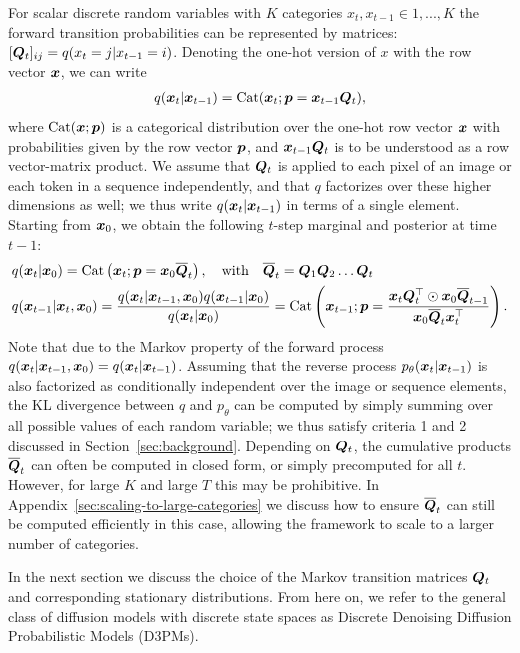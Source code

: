 For scalar discrete random variables with $K$ categories $x_t, x_{t-1} \in {1, ..., K}$
the forward transition probabilities can be represented by matrices: $[\boldsymbol{Q}_t]_{ij} = q(x_t=j|x_{t-1}=i)$.
Denoting the one-hot version of $x$ with the row vector $\boldsymbol{x}$, we can write
\begin{align}
    q(\boldsymbol{x}_t|\boldsymbol{x}_{t-1}) = \mathrm{Cat}(\boldsymbol{x}_t;\boldsymbol{p} = \boldsymbol{x}_{t-1}\boldsymbol{Q}_t),
    \label{eq:forward_Q_t}
\end{align}
where $\mathrm{Cat}(\boldsymbol{x};\boldsymbol{p})$ is a categorical distribution over the one-hot row vector $\boldsymbol{x}$ with probabilities given by the row vector $\boldsymbol{p}$, and $\boldsymbol{x}_{t-1}\boldsymbol{Q}_t$ is to be understood as a row vector-matrix product. 
We assume that $\boldsymbol{Q}_t$ is applied to each pixel of an image or each token in a sequence independently, and that $q$ factorizes over these higher dimensions as well; we thus write $q(\boldsymbol{x}_t|\boldsymbol{x}_{t-1})$ in terms of a single element.
Starting from $\boldsymbol{x}_0$, we obtain the following $t$-step marginal and posterior at time $t-1$:
\begin{align}
    &q(\boldsymbol{x}_t | \boldsymbol{x}_0) = \mathrm{Cat}\left(\boldsymbol{x}_{t}; \boldsymbol{p} = \boldsymbol{x}_{0}\overline{\boldsymbol{Q}}_{t}  \right), 
    \quad \text{with}\quad 
  \overline{\boldsymbol{Q}}_{t} = \boldsymbol{Q}_1  \boldsymbol{Q}_2 \hdots \boldsymbol{Q}_t \nonumber \\
    & q(\boldsymbol{x}_{t-1}|\boldsymbol{x}_{t}, \boldsymbol{x}_0) = \frac{q(\boldsymbol{x}_{t}|\boldsymbol{x}_{t-1}, \boldsymbol{x}_0)q(\boldsymbol{x}_{t-1}|\boldsymbol{x}_0)}{q(\boldsymbol{x}_{t}| \boldsymbol{x}_0)}
    =\mathrm{Cat}\left(\boldsymbol{x}_{t-1};\boldsymbol{p}= \frac{\boldsymbol{x}_t\boldsymbol{Q}_t^{\top} \odot  \boldsymbol{x}_0 \overline{\boldsymbol{Q}}_{t-1}  }{\boldsymbol{x}_0 \overline{\boldsymbol{Q}}_{t} \boldsymbol{x}_t^\top}\right).
    \label{eq:discrete_t_step_posterior}
\end{align}
Note that due to the Markov property of the forward process $q(\boldsymbol{x}_t|\boldsymbol{x}_{t-1}, \boldsymbol{x}_0)= q(\boldsymbol{x}_{t}|\boldsymbol{x}_{t-1})$. 
Assuming that the reverse process $p_\theta(\boldsymbol{x}_t|\boldsymbol{x}_{t-1})$ is also factorized as conditionally independent over the image or sequence elements, the KL divergence between $q$ and $p_\theta$ can be computed by simply summing over all possible values of each random variable; we thus satisfy criteria 1 and 2 discussed in Section~\ref{sec:background}.
Depending on $\boldsymbol{Q}_t$, the cumulative products $\overline{\boldsymbol{Q}}_t$ can often be computed in closed form, or simply precomputed for all $t$.
However, for large $K$ and large $T$ this may be prohibitive. In Appendix~\ref{sec:scaling-to-large-categories} we discuss how to ensure $\overline{\boldsymbol{Q}}_t$ can still be computed efficiently in this case, allowing the framework to scale to a larger number of categories. 

In the next section we discuss the choice of the Markov transition matrices $\boldsymbol{Q}_t$ and corresponding stationary distributions. From here on, we refer to the general class of diffusion models with discrete state spaces as Discrete Denoising Diffusion Probabilistic Models (D3PMs).

